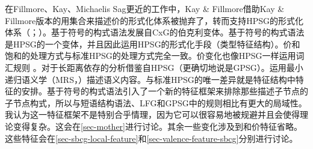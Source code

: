 在Fillmore、Kay、Michaelis \biband Sag更近的工作中，Kay \& Fillmore借助Kay \& Fillmore版本的用集合来描述价的形式化体系被抛弃了，转而支持HPSG的形式化体系（\citealp{Kay2005a,Michaelis2006a,Sag2012a}；\citealp*[--11]{SBK2012a}）。基于符号的构式语法发展自CxG的伯克利变体。基于符号的构式语法是HPSG的一个变体\citep[]{Sag2010b}，并且因此运用HPSG的形式化手段（类型特征结构）。价和饱和的处理方式与标准HPSG的处理方式完全一致。价变化也像HPSG一样运用词汇规则 \citep*[\S~2.3]{SBK2012a}。对于长距离依存的分析借鉴自HPSG（更确切地说是GPSG\indexgpsgc）。运用最小递归语义学（MRS\indexmrsc，\citealp*{CFPS2005a}）描述语义内容。与标准HPSG的唯一差异就是特征结构中特征的安排。基于符号的构式语法引入了一个新的特征框架来排除那些描述子节点的子节点构式，所以与短语结构语法、LFG和GPSG中的规则相比有更大的局域性。我认为这一特征框架不是特别合乎情理，因为它可以很容易地被规避并且会使得理论变得复杂。这会在\ref{sec-mother}进行讨论。其余一些变化涉及到\localfc 和价特征省略。这些特征会在\ref{sec-sbcg-local-feature}和\ref{sec-valence-feature-sbcg}分别进行讨论。


